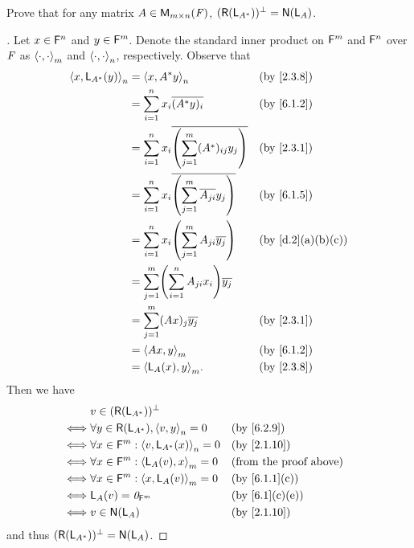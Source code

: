 \begin{ex}\label{ex:6.2.12}
  Prove that for any matrix \(A \in \ms\), \((\rg{\L_{A^*}})^{\perp} = \ns{\L_A}\).
\end{ex}

\begin{proof}[]
  Let \(x \in \mathsf{F}^n\) and \(y \in \mathsf{F}^m\).
  Denote the standard inner product on \(\mathsf{F}^m\) and \(\mathsf{F}^n\) over \(\mathit{F}\) as \(\left\langle\cdot, \cdot\right\rangle_m\) and \(\left\langle\cdot, \cdot\right\rangle_n\), respectively.
  Observe that
  \begin{align*}
    \inn{x, \L_{A^*}(y)}_n & = \inn{x, A^* y}_n                                                 &  & \by{2.3.8}      \\
                           & = \sum_{i = 1}^n x_i \conj{(A^* y)_i}                              &  & \by{6.1.2}      \\
                           & = \sum_{i = 1}^n x_i \conj{\pa{\sum_{j = 1}^m (A^*)_{i j} y_j}}    &  & \by{2.3.1}      \\
                           & = \sum_{i = 1}^n x_i \conj{\pa{\sum_{j = 1}^m \conj{A_{j i}} y_j}} &  & \by{6.1.5}      \\
                           & = \sum_{i = 1}^n x_i \pa{\sum_{j = 1}^m A_{j i} \conj{y_j}}        &  & \by{d.2}[a,b,c] \\
                           & = \sum_{j = 1}^m \pa{\sum_{i = 1}^n A_{j i} x_i} \conj{y_j}                             \\
                           & = \sum_{j = 1}^m (Ax)_j \conj{y_j}                                 &  & \by{2.3.1}      \\
                           & = \inn{Ax, y}_m                                                    &  & \by{6.1.2}      \\
                           & = \inn{\L_A(x), y}_m.                                              &  & \by{2.3.8}
  \end{align*}
  Then we have
  \begin{align*}
         & v \in (\rg{\L_{A^*}})^{\perp}                                                          \\
    \iff & \forall y \in \rg{\L_{A^*}}, \inn{v, y}_n = 0       &  & \by{6.2.9}                    \\
    \iff & \forall x \in \vs{F}^m : \inn{v, \L_{A^*}(x)}_n = 0 &  & \by{2.1.10}                   \\
    \iff & \forall x \in \vs{F}^m : \inn{\L_A(v), x}_m = 0     &  & \text{(from the proof above)} \\
    \iff & \forall x \in \vs{F}^m : \inn{x, \L_A(v)}_m = 0     &  & \by{6.1.1}[c]                 \\
    \iff & \L_A(v) = \zv_{\vs{F}^m}                            &  & \by{6.1}[c,e]                 \\
    \iff & v \in \ns{\L_A}                                     &  & \by{2.1.10}
  \end{align*}
  and thus \((\rg{\L_{A^*}})^{\perp} = \ns{\L_A}\).
\end{proof}

